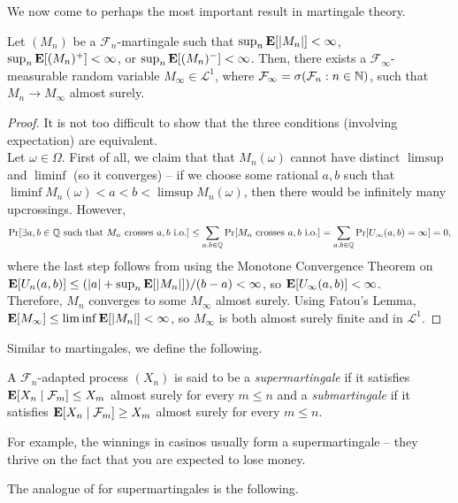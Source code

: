 We now come to perhaps the most important result in martingale theory.

\begin{ftheo}
	\label{martingale convergence theorem}
	Let $(M_n)$ be a $\mathcal{F}_n$-martingale such that $\sup_n\textbf{E}[|M_n|]<\infty$, $\sup_n\textbf{E}[(M_n)^+]<\infty$, or $\sup_n\textbf{E}[(M_n)^-]<\infty$. Then, there exists a $\mathcal{F}_\infty$-measurable random variable $M_\infty\in\mathcal{L}^1$, where $\mathcal{F}_\infty = \sigma(\mathcal{F}_n : n\in\mathbb{N})$, such that $M_n\to M_\infty$ almost surely.
\end{ftheo}
\begin{proof}
	It is not too difficult to show that the three conditions (involving expectation) are equivalent.\\
	Let $\omega\in\Omega$. First of all, we claim that that $M_n(\omega)$ cannot have distinct $\limsup$ and $\liminf$ (so it converges) -- if we choose some rational $a,b$ such that $\liminf M_n(\omega)<a<b<\limsup M_n(\omega)$, then there would be infinitely many upcrossings. However,
	\[ \Pr[\exists a,b\in\mathbb{Q}\text{ such that $M_n$ crosses $a,b$ i.o.}] \leq \sum_{a,b\in\mathbb{Q}} \Pr[M_n\text{ crosses $a,b$ i.o.}] = \sum_{a,b\in\mathbb{Q}}\Pr[U_\infty(a,b)=\infty] = 0, \]
	where the last step follows from using the Monotone Convergence Theorem on $\textbf{E}[U_n(a,b)] \leq (|a|+\sup_n\textbf{E}[|M_n|])/(b-a) < \infty$, so $\textbf{E}[U_\infty(a,b)]<\infty$.\\
	Therefore, $M_n$ converges to some $M_\infty$ almost surely. Using Fatou's Lemma, $\textbf{E}[M_\infty] \leq \liminf \textbf{E}[|M_n|] < \infty$, so $M_\infty$ is both almost surely finite and in $\mathcal{L}^1$.
\end{proof}

Similar to martingales, we define the following.

\begin{definition}
	A $\mathcal{F}_n$-adapted process $(X_n)$ is said to be a \textit{supermartingale} if it satisfies $\textbf{E}[X_n\mid\mathcal{F}_m] \leq X_m$ almost surely for every $m\leq n$ and a \textit{submartingale} if it satisfies $\textbf{E}[X_n\mid\mathcal{F}_m] \geq X_m$ almost surely for every $m\leq n$. 
\end{definition}

For example, the winnings in casinos usually form a supermartingale -- they thrive on the fact that you are expected to lose money.

The analogue of  for supermartingales is the following.

